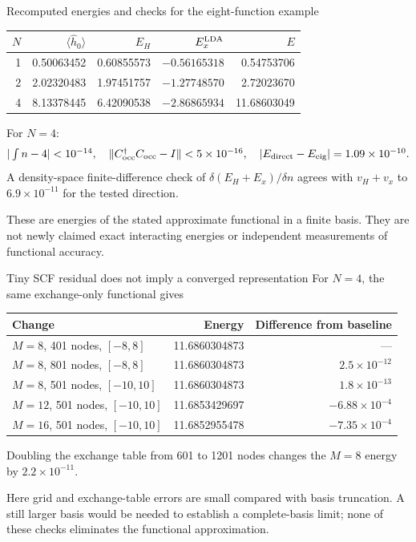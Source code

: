 \documentclass[aspectratio=169,10pt]{beamer}
\newcommand{\warnbox}[1]{\begin{tcolorbox}[colback=palewarm,colframe=warm,title={A trap to avoid}]#1\end{tcolorbox}}
\newcommand{\dftbox}[1]{\begin{tcolorbox}[colback=paleteal,colframe=teal,title={Key result}]#1\end{tcolorbox}}
\newcommand{\avg}[1]{\langle #1\rangle}
\newcommand{\occ}{\mathrm{occ}}
\begin{document}
\begin{frame}{Recomputed energies and checks for the eight-function example}
\begin{center}\small
\begin{tabular}{@{}rrrrr@{}}\toprule
$N$ & $\avg{\hat h_0}$ & $E_H$ & $E_x^{\rm LDA}$ & $E$\\\midrule
1 & 0.50063452 & 0.60855573 & $-0.56165318$ & 0.54753706\\
2 & 2.02320483 & 1.97451757 & $-1.27748570$ & 2.72023670\\
4 & 8.13378445 & 6.42090538 & $-2.86865934$ & 11.68603049\\\bottomrule
\end{tabular}
\end{center}
For $N=4$:
\[
 |\textstyle\int n-4|<10^{-14},\quad
 \|C_{\occ}^\dagger C_{\occ}-I\|<5\times10^{-16},\quad
 |E_{\rm direct}-E_{\rm eig}|=1.09\times10^{-10}.
\]
A density-space finite-difference check of $\delta(E_H+E_x)/\delta n$
agrees with $v_H+v_x$ to $6.9\times10^{-11}$ for the tested direction.
\warnbox{These are energies of the stated approximate functional in a finite
basis. They are not newly claimed exact interacting energies or independent
measurements of functional accuracy.}
\end{frame}

\begin{frame}{Tiny SCF residual does not imply a converged representation}
For $N=4$, the same exchange-only functional gives
\begin{center}\small
\begin{tabular}{@{}lrr@{}}\toprule
Change & Energy & Difference from baseline\\\midrule
$M=8$, 401 nodes, $[-8,8]$ & 11.6860304873 & ---\\
$M=8$, 801 nodes, $[-8,8]$ & 11.6860304873 & $2.5\times10^{-12}$\\
$M=8$, 501 nodes, $[-10,10]$ & 11.6860304873 & $1.8\times10^{-13}$\\
$M=12$, 501 nodes, $[-10,10]$ & 11.6853429697 & $-6.88\times10^{-4}$\\
$M=16$, 501 nodes, $[-10,10]$ & 11.6852955478 & $-7.35\times10^{-4}$\\\bottomrule
\end{tabular}
\end{center}
Doubling the exchange table from 601 to 1201 nodes changes the $M=8$ energy
by $2.2\times10^{-11}$.
\dftbox{Here grid and exchange-table errors are small compared with basis
truncation. A still larger basis would be needed to establish a complete-basis
limit; none of these checks eliminates the functional approximation.}
\end{frame}
\end{document}
